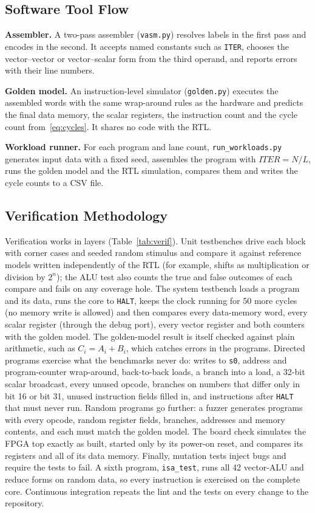 \documentclass[journal]{IEEEtran}
\begin{document}
\subsection{Software Tool Flow}\label{sec:tools}
\textbf{Assembler.} A two-pass assembler (\texttt{vasm.py}) resolves labels in the
first pass and encodes in the second. It accepts named constants such as \texttt{ITER},
chooses the vector--vector or vector--scalar form from the third operand, and reports
errors with their line numbers.

\textbf{Golden model.} An instruction-level simulator (\texttt{golden.py}) executes the
assembled words with the same wrap-around rules as the hardware and predicts the final
data memory, the scalar registers, the instruction count and the cycle count
from~\eqref{eq:cycles}. It shares no code with the RTL.

\textbf{Workload runner.} For each program and lane count, \texttt{run\_workloads.py}
generates input data with a fixed seed, assembles the program with
$\mathit{ITER} = N/L$, runs the golden model and the RTL simulation, compares them and
writes the cycle counts to a CSV file.

\subsection{Verification Methodology}\label{sec:verif}
Verification works in layers (Table~\ref{tab:verif}). Unit testbenches drive each block
with corner cases and seeded random stimulus and compare it against reference models
written independently of the RTL (for example, shifts as multiplication or division by
$2^n$); the ALU test also counts the true and false outcomes of each compare and fails
on any coverage hole. The system testbench loads a program and its data, runs the core
to \texttt{HALT}, keeps the clock running for 50 more cycles (no memory write is
allowed) and then compares every data-memory word, every scalar register (through the
debug port), every vector register and both counters with the golden model. The golden-model result is
itself checked against plain arithmetic, such as $C_i = A_i + B_i$, which catches
errors in the programs. Directed programs exercise what the benchmarks never do:
writes to \texttt{s0}, address and program-counter wrap-around, back-to-back loads, a
branch into a load, a 32-bit scalar broadcast, every unused opcode, branches on numbers
that differ only in bit 16 or bit 31, unused instruction fields filled in, and
instructions after \texttt{HALT} that must never run. Random programs go further: a
fuzzer generates programs with every opcode, random register fields, branches,
addresses and memory contents, and each must match the golden model. The board check
simulates the FPGA top exactly as built, started only by its power-on reset, and
compares its registers and all of its data memory. Finally, mutation tests inject bugs
and require the tests to fail. A sixth program,
\texttt{isa\_test}, runs all 42 vector-ALU and reduce forms on random data, so every
instruction is exercised on the complete core. Continuous integration repeats the lint
and the tests on every change to the repository.
\end{document}
